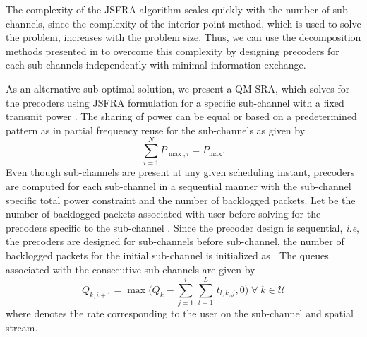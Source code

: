 The complexity of the \ac{JSFRA} algorithm scales quickly with the number of sub-channels, since the complexity of the interior point method, which is used to solve the problem, increases with the problem size. Thus, we can use the decomposition methods presented in \cite{palomar2006tutorial,boyd2011distributed} to overcome this complexity by designing precoders for each sub-channels independently with minimal information exchange.

As an alternative sub-optimal solution, we present a \acl{QM} \ac{SRA}, which solves for the precoders using \ac{JSFRA} formulation for a specific sub-channel  with a fixed transmit power . The sharing of power can be equal or based on a predetermined pattern as in partial frequency reuse for the sub-channels as given by
\begin{equation}
\sum_{i=1}^N P_{\max,i} = P_{\max}.
\end{equation}
Even though  sub-channels are present at any given scheduling instant, precoders are computed for each sub-channel in a sequential manner with the sub-channel specific total power constraint  and the number of backlogged packets. Let  be the number of backlogged packets associated with user  before solving for the precoders specific to the sub-channel . Since the precoder design is sequential, \textit{i.e}, the precoders are designed for sub-channels \me{[0,i-1]} before  sub-channel, the number of backlogged packets for the initial sub-channel is initialized as . The queues associated with the consecutive sub-channels are given by
\begin{equation}	\label{eqn-weight}
	Q_{k,i+1} = \max \Big ( Q_k - \sum_{j = 1}^{i} \, \sum_{l = 1}^{L} \, t_{l,k,j} ,0 \Big ) \; \forall \; k \in \mathcal{U}
\end{equation}
where  denotes the rate corresponding to the user  on the  sub-channel and  spatial stream. 

